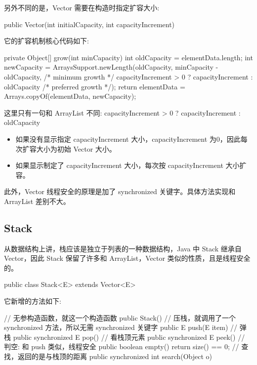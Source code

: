 另外不同的是，Vector 需要在构造时指定扩容大小:

\begin{Java}
public Vector(int initialCapacity, int capacityIncrement)
\end{Java}

它的扩容机制核心代码如下:

\begin{Java}
private Object[] grow(int minCapacity) {
    int oldCapacity = elementData.length;
    int newCapacity = ArraysSupport.newLength(oldCapacity,
            minCapacity - oldCapacity, /* minimum growth */
            capacityIncrement > 0 ? capacityIncrement : oldCapacity
                                       /* preferred growth */);
    return elementData = Arrays.copyOf(elementData, newCapacity);
}
\end{Java}

这里只有一句和 ArrayList 不同: capacityIncrement > 0 ? capacityIncrement : oldCapacity
\begin{itemize}
    \item 如果没有显示指定 capacityIncrement 大小，capacityIncrement 为0，因此每次扩容大小为初始 Vector 大小。
    \item 如果显示制定了 capacityIncrement 大小，每次按 capacityIncrement 大小扩容。
\end{itemize}

此外，Vector 线程安全的原理是加了 synchronized 关键字。具体方法实现和 ArrayList 差别不大。

\subsection{Stack}

从数据结构上讲，栈应该是独立于列表的一种数据结构，Java 中 Stack 继承自 Vector，因此 Stack 保留了许多和 ArrayList，Vector 类似的性质，且是线程安全的。

\begin{Java}
public class Stack<E> extends Vector<E>
\end{Java}

它新增的方法如下:

\begin{Java}
// 无参构造函数，就这一个构造函数
public Stack()
// 压栈，就调用了一个 synchronized 方法，所以无需 synchronized 关键字
public E push(E item)
// 弹栈
public synchronized E pop()
// 看栈顶元素
public synchronized E peek()
// 判空: 和 push 类似，线程安全
public boolean empty()
    return size() == 0;
// 查找，返回的是与栈顶的距离
public synchronized int search(Object o)
\end{Java}

\newpage